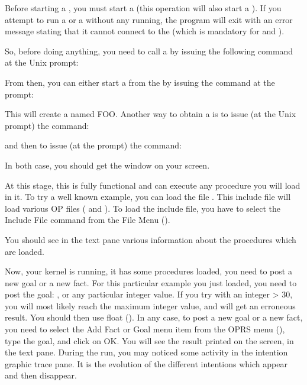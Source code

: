 Before starting a \XPK{}, you must start a \OPRSS{} (this operation
will also start a \MP{}). If you attempt to run a \XPK{} or a \CPK{}
without any \OPRSS{} running, the program will exit with an error
message stating that it cannot connect to the \MP{} (which is mandatory
for \XPK{} and \CPK{}).

So, before doing anything, you need to call a \OPRSS{} by issuing
the following command at the Unix prompt:


From then, you can either start a \XPK{} from the \OPRSS{} by issuing
the command at the \OPRSS{} prompt:


This will create a \XPK{} named FOO. Another way to obtain a \XPK{} is to
issue (at the Unix prompt) the command:


and then to issue (at the \OPRSS{} prompt) the command:


In both case, you should get the \XPK{} window on your screen.

At this stage, this \XPK{} is fully functional and can execute any
procedure you will load in it. To try a well known example, you can load
the file . This include file will
load various OP files ( and
). To load the include file,
you have to select the Include File command from the File Menu
().

You should see in the text pane various information about the procedures
which are loaded.

Now, your kernel is running, it has some procedures loaded, you need to
post a new goal or a new fact. For this particular example you just loaded,
you need to post the goal: , or any
particular integer value. If you try with an integer > 30, you will most
likely reach the maximum integer value, and will get an erroneous result.
You should then use float (). In any
case, to post a new goal or a new fact, you need to select the Add Fact or
Goal menu item from the OPRS menu (), type the goal,
and click on OK. You will see the result printed on the screen, in the text
pane. During the run, you may  noticed some activity in the intention
graphic trace pane. It is the evolution of the different intentions
which appear and then disappear.

